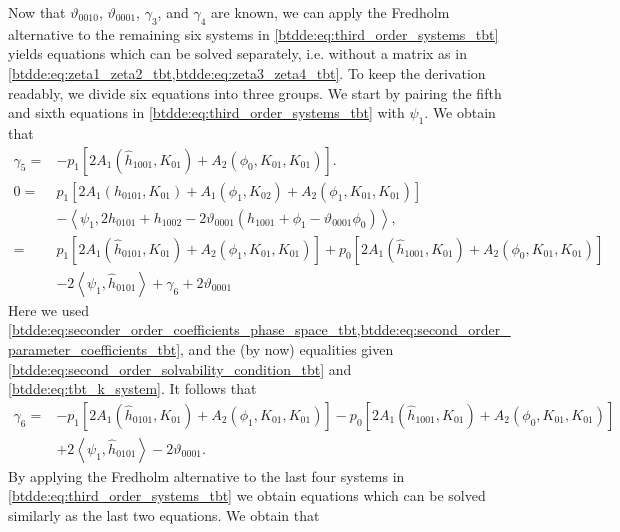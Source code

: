 Now that $\vartheta_{0010}$, $\vartheta_{0001}$, $\gamma_3$, and $\gamma_4$ are
known, we can apply the Fredholm alternative to the remaining six systems in
\cref{btdde:eq:third_order_systems_tbt} yields equations which can be solved
separately, i.e. without a matrix as in
\cref{btdde:eq:zeta1_zeta2_tbt,btdde:eq:zeta3_zeta4_tbt}. To keep the derivation readably,
we divide six equations into three groups. We start by pairing the fifth and
sixth equations in \cref{btdde:eq:third_order_systems_tbt} with $\psi_1$. We obtain that 
\begin{align*}
\gamma_5 ={}& -p_1\left[2 A_1(\hat h_{1001}, K_{01}) + A_2(\phi_0,K_{01},K_{01})\right]. \\
0 ={}& p_1 \left[2 A_1(h_{0101},K_{01}) + A_1(\phi_1,K_{02}) + A_2(\phi_1,K_{01},K_{01})\right] \\
     & -\left< \psi_1, 2 h_{0101} + h_{1002} - 2 \vartheta_{0001} (h_{1001} + \phi_1 - \vartheta_{0001} \phi_0) \right>, \\
  ={}& p_1 \left[2 A_1(\hat h_{0101},K_{01}) + A_2(\phi_1,K_{01},K_{01})\right]  
     + p_0 \left[2 A_1(\hat h_{1001},K_{01})+ A_2(\phi_0,K_{01},K_{01})\right] \\
     & -2 \left< \psi_1, \hat h_{0101} \right> + \gamma_6 + 2 \vartheta_{0001}
\end{align*}
Here we used
\cref{btdde:eq:seconder_order_coefficients_phase_space_tbt,btdde:eq:second_order_parameter_coefficients_tbt},
and the (by now) equalities given \cref{btdde:eq:second_order_solvability_condition_tbt} and 
\cref{btdde:eq:tbt_k_system}. It follows that 
\begin{equation}
\begin{aligned}
\gamma_6 ={}& -p_1 \left[2 A_1(\hat h_{0101},K_{01}) + A_2(\phi_1,K_{01},K_{01})\right]  
              - p_0 \left[2 A_1(\hat h_{1001},K_{01})+ A_2(\phi_0,K_{01},K_{01})\right] \\
            & +2 \left< \psi_1, \hat h_{0101} \right> - 2 \vartheta_{0001}. \nonumber
\end{aligned}
\end{equation}
%
By applying the Fredholm alternative to the last four systems in
\cref{btdde:eq:third_order_systems_tbt} we obtain equations which can be solved 
similarly as the last two equations. We obtain that

